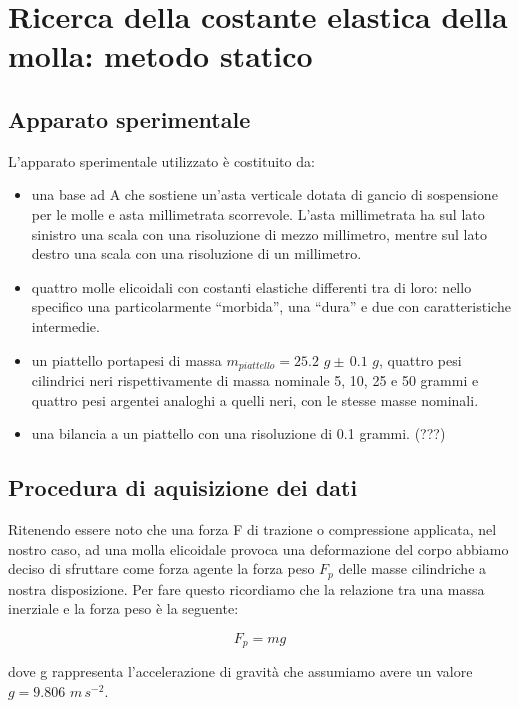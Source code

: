 \section{Ricerca della costante elastica della molla: metodo statico}

\subsection{Apparato sperimentale}
L'apparato sperimentale utilizzato è costituito da:
	\begin{itemize}
		\item{una base ad A che sostiene un'asta verticale dotata di gancio di sospensione per le molle e asta millimetrata scorrevole. L'asta millimetrata ha sul lato sinistro una scala con una risoluzione di mezzo millimetro, mentre sul lato destro una scala con una risoluzione di un millimetro.}
		\item{quattro molle elicoidali con costanti elastiche differenti tra di loro: nello specifico una particolarmente ``morbida'', una ``dura'' e due con caratteristiche intermedie.}
		\item{un piattello portapesi di massa $m_{piattello} = 25.2\,\,g \pm\, 0.1\,\,g$, quattro pesi cilindrici neri rispettivamente di massa nominale 5, 10, 25 e 50 grammi e quattro pesi argentei analoghi a quelli neri, con le stesse masse nominali.}
        \item{una bilancia a un piattello con una risoluzione di 0.1 grammi. (???)}
	\end{itemize}

\subsection{Procedura di aquisizione dei dati}

Ritenendo essere noto che una forza F di trazione o compressione applicata, nel nostro caso, ad una molla elicoidale provoca una deformazione del corpo abbiamo deciso di sfruttare come forza agente la forza peso $F_{p}$ delle masse cilindriche a nostra disposizione. Per fare questo ricordiamo che la relazione tra una massa inerziale e la forza peso è la seguente:

\begin{equation}
	F_{p} = mg
\end{equation}

dove g rappresenta l'accelerazione di gravità che assumiamo avere un valore $g = 9.806\,\,m\,s^{-2}$.

